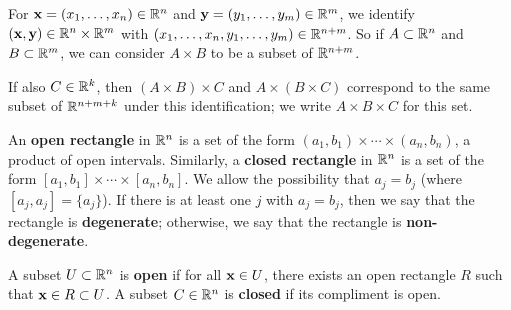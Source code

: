 \documentclass[../main.tex]{subfiles}
\begin{document}
\begin{remark}\label{rmk:18.12}
    For $\mathbf{x}=(x_1,\dots,x_n)\in\mathbb{R}^n$ and $\mathbf{y}=(y_1,\dots,y_m)\in\mathbb{R}^m$, we identify $(\mathbf{x},\mathbf{y})\in\mathbb{R}^n\times\mathbb{R}^m$ with $(x_1,\dots,x_n,y_1,\dots,y_m)\in\mathbb{R}^{n+m}$. So if $A\subset\mathbb{R}^n$ and $B\subset\mathbb{R}^m$, we can consider $A\times B$ to be a subset of $\mathbb{R}^{n+m}$.\par
    If also $C\in\mathbb{R}^k$, then $(A\times B)\times C$ and $A\times(B\times C)$ correspond to the same subset of $\mathbb{R}^{n+m+k}$ under this identification; we write $A\times B\times C$ for this set.
\end{remark}

\begin{definition}\label{dfn:18.13}
    An \textbf{open rectangle} in $\mathbb{R}^n$ is a set of the form $(a_1,b_1)\times\cdots\times(a_n,b_n)$, a product of open intervals. Similarly, a \textbf{closed rectangle} in $\mathbb{R}^n$ is a set of the form $[a_1,b_1]\times\cdots\times[a_n,b_n]$. We allow the possibility that $a_j=b_j$ (where $[a_j,a_j]=\{a_j\}$). If there is at least one $j$ with $a_j=b_j$, then we say that the rectangle is \textbf{degenerate}; otherwise, we say that the rectangle is \textbf{non-degenerate}.
\end{definition}

\begin{definition}\label{dfn:18.14}
    A subset $U\subset\mathbb{R}^n$ is \textbf{open} if for all $\mathbf{x}\in U$, there exists an open rectangle $R$ such that $\mathbf{x}\in R\subset U$. A subset $C\in\mathbb{R}^n$ is \textbf{closed} if its compliment is open.
\end{definition}
\end{document}
